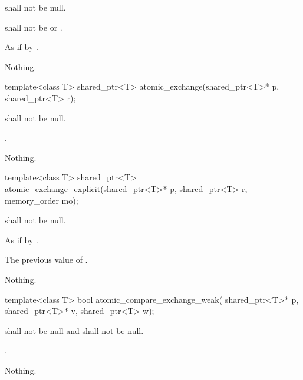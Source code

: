 \begin{itemdescr}
\pnum
\requires {} shall not be null.

\pnum
\requires {} shall not be  or .

\pnum
\effects As if by .

\pnum
\throws Nothing.
\end{itemdescr}

%
%
\begin{itemdecl}
template<class T>
  shared_ptr<T> atomic_exchange(shared_ptr<T>* p, shared_ptr<T> r);
\end{itemdecl}

\begin{itemdescr}
\pnum
\requires {} shall not be null.

\pnum
\returns {}.

\pnum
\throws Nothing.
\end{itemdescr}

%
%
\begin{itemdecl}
template<class T>
  shared_ptr<T> atomic_exchange_explicit(shared_ptr<T>* p, shared_ptr<T> r,
                                         memory_order mo);
\end{itemdecl}

\begin{itemdescr}
\pnum
\requires {} shall not be null.

\pnum
\effects As if by .

\pnum
\returns The previous value of .

\pnum
\throws Nothing.
\end{itemdescr}

%
%
\begin{itemdecl}
template<class T>
  bool atomic_compare_exchange_weak(
    shared_ptr<T>* p, shared_ptr<T>* v, shared_ptr<T> w);
\end{itemdecl}

\begin{itemdescr}
\pnum
\requires {} shall not be null and  shall not be null.

\pnum
\returns {}.

\pnum
\throws Nothing.
\end{itemdescr}

